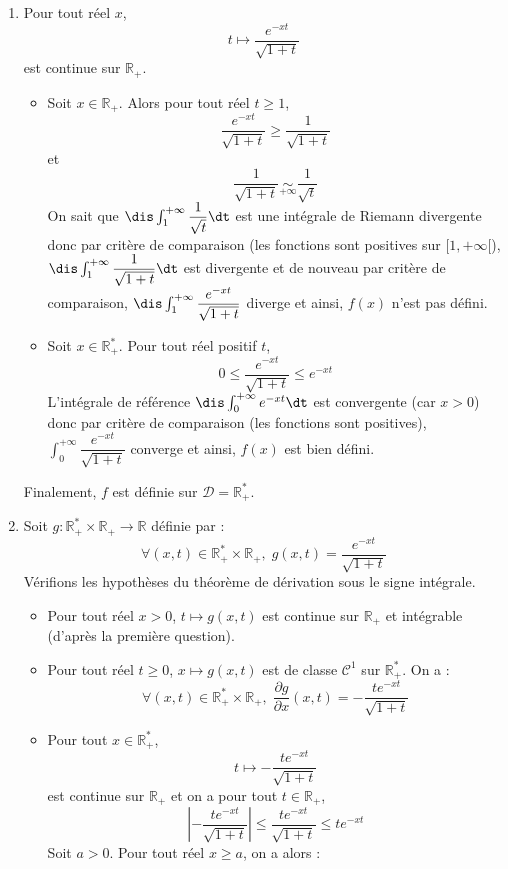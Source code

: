 \documentclass[a4paper,10pt]{report}
\begin{document}
\begin{enumerate}
\item Pour tout réel $x$,
$$ t \mapsto \dfrac{e^{-xt}}{\sqrt{1+t}}$$
est continue sur $\mathbb{R}_+$.

\begin{itemize}
\item Soit $x \in \mathbb{R}_+$. Alors pour tout réel $t \geq 1$,
$$ \dfrac{e^{-xt}}{\sqrt{1+t}} \geq \dfrac{1}{\sqrt{1+t}}$$
et 
$$ \dfrac{1}{\sqrt{1+t}} \underset{+ \infty}{\sim} \dfrac{1}{\sqrt{t}}$$
On sait que $\dis \int_1^{+ \infty} \dfrac{1}{\sqrt{t}} \dt$ est une intégrale de Riemann divergente donc par critère de comparaison (les fonctions sont positives sur $[1, + \infty[$), $\dis \int_1^{+ \infty}  \dfrac{1}{\sqrt{1+t}}  \dt$ est divergente et de nouveau par critère de comparaison, $\dis \int_1^{+ \infty} \dfrac{e^{-xt}}{\sqrt{1+t}}$ diverge et ainsi, $f(x)$ n'est pas défini.
\item Soit $x \in \mathbb{R}_+^*$. Pour tout réel positif $t$,
$$ 0 \leq  \dfrac{e^{-xt}}{\sqrt{1+t}} \leq e^{-xt}$$
L'intégrale de référence $\dis \int_0^{+ \infty} e^{-xt} \dt$ est convergente (car $x>0$) donc par critère de comparaison (les fonctions sont positives), $ \int_0^{+ \infty} \dfrac{e^{-xt}}{\sqrt{1+t}}$ converge et ainsi, $f(x)$ est bien défini.
\end{itemize}
Finalement, $f$ est définie sur $\mathcal{D}= \mathbb{R}_+^*$.
\item Soit $g : \mathbb{R}_+^* \times \mathbb{R}_+ \rightarrow \mathbb{R}$ définie par :
$$ \forall (x,t) \in \mathbb{R}_+^* \times \mathbb{R}_+, \; g(x,t) = \dfrac{e^{-xt}}{\sqrt{1+t}} $$
Vérifions les hypothèses du théorème de dérivation sous le signe intégrale.
\begin{itemize}
\item Pour tout réel $x>0$, $t \mapsto g(x,t)$ est continue sur $\mathbb{R}_+$ et intégrable (d'après la première question).
\item Pour tout réel $t \geq 0$, $x \mapsto g(x,t)$ est de classe $\mathcal{C}^1$ sur $\mathbb{R}_+^*$. On a :
$$ \forall (x,t) \in \mathbb{R}_+^* \times \mathbb{R}_+, \; \dfrac{\partial g}{\partial x}(x,t) =  -  \dfrac{te^{-xt}}{\sqrt{1+t}}$$
\item Pour tout $x \in \mathbb{R}_+^*$,
$$ t \mapsto   -  \dfrac{te^{-xt}}{\sqrt{1+t}}$$
est continue sur $\mathbb{R}_+$ et on a pour tout $t \in \mathbb{R}_+$,
$$ \left\vert  -  \dfrac{te^{-xt}}{\sqrt{1+t}} \right\vert \leq  \dfrac{te^{-xt}}{\sqrt{1+t}} \leq t e^{-xt}$$
Soit $a>0$. Pour tout réel $x \geq a$, on a alors :

\end{itemize}
\end{enumerate}
\end{document}
